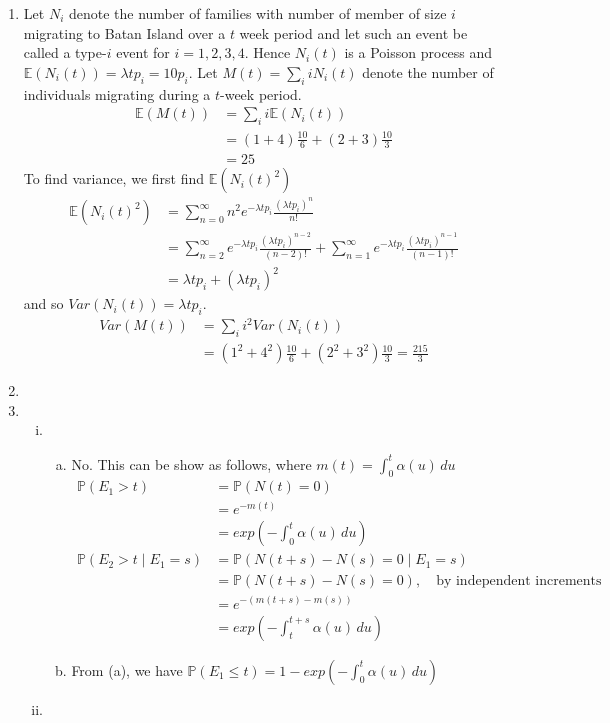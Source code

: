 \documentclass[a4paper,10pt]{article}
\theoremstyle{definition}
\begin{document}
\begin{enumerate}
\item Let $N_i$ denote the number of families with number of member of size $i$ migrating to Batan Island over a $t$ week period and let such an event be called a type-$i$ event for $i=1,2,3,4$. Hence $N_i(t)$ is a Poisson process and $\mathbb{E}(N_i(t))=\lambda t p_i=10p_i$. Let $M(t)=\sum_{i}iN_i(t)$ denote the number of individuals migrating during a $t$-week period. 
\begin{align*}
\mathbb{E}(M(t))&=\sum_{i}i\mathbb{E}(N_i(t))\\
&=(1+4)\frac{10}{6}+(2+3)\frac{10}{3}\\
&=25
\end{align*}
To find variance, we first find $\mathbb{E}(N_i(t)^2)$
\begin{align*}
\mathbb{E}(N_i(t)^2)&=\sum_{n=0}^{\infty}n^2e^{-\lambda t p_i}\frac{(\lambda t p_i)^n}{n!}\\
&=\sum_{n=2}^{\infty}e^{-\lambda t p_i}\frac{(\lambda t p_i)^{n-2}}{(n-2)!}+\sum_{n=1}^{\infty}e^{-\lambda t p_i}\frac{(\lambda t p_i)^{n-1}}{(n-1)!}\\
&=\lambda t p_i+(\lambda t p_i)^2
\end{align*}
and so $Var(N_i(t))=\lambda t p_i$.
\begin{align*}
Var(M(t))&=\sum_{i}i^2Var(N_i(t))\\
&=(1^2+4^2)\frac{10}{6}+(2^2+3^2)\frac{10}{3}=\frac{215}{3}
\end{align*}

\item

\item
\begin{enumerate}[(i)]
\item
\begin{enumerate}[(a)]
\item No. This can be show as follows, where $m(t)=\int_{0}^{t}\alpha(u)\,du$
\begin{align*}
\mathbb{P}(E_1>t)&=\mathbb{P}(N(t)=0)\\
&=e^{-m(t)}\\
&=exp\left(-\int_{0}^{t}\alpha(u)\,du\right)\\
\mathbb{P}(E_2>t\mid E_1=s)&=\mathbb{P}(N(t+s)-N(s)=0\mid E_1=s)\\
&=\mathbb{P}(N(t+s)-N(s)=0),\quad \text{by independent increments}\\
&=e^{-(m(t+s)-m(s))}\\
&=exp\left(-\int_{t}^{t+s}\alpha(u)\,du\right)
\end{align*}
\item From (a), we have $\mathbb{P}(E_1\leq t)=1-exp\left(-\int_{0}^{t}\alpha(u)\,du\right)$
\end{enumerate}
\item
\end{enumerate}


\end{enumerate}
\end{document}
